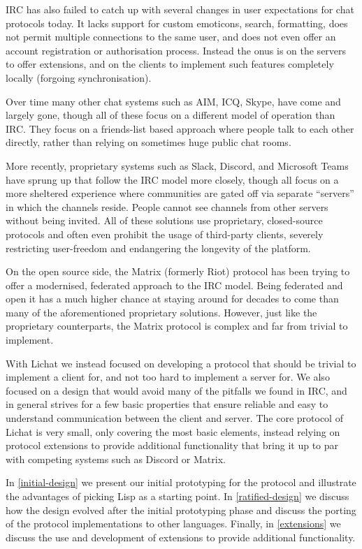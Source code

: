 \documentclass[format=sigconf]{acmart}
\begin{document}
IRC has also failed to catch up with several changes in user expectations for chat protocols today. It lacks support for custom emoticons, search, formatting, does not permit multiple connections to the same user, and does not even offer an account registration or authorisation process. Instead the onus is on the servers to offer extensions, and on the clients to implement such features completely locally (forgoing synchronisation).

Over time many other chat systems such as AIM, ICQ, Skype, have come and largely gone, though all of these focus on a different model of operation than IRC. They focus on a friends-list based approach where people talk to each other directly, rather than relying on sometimes huge public chat rooms.

More recently, proprietary systems such as Slack, Discord, and Microsoft Teams have sprung up that follow the IRC model more closely, though all focus on a more sheltered experience where communities are gated off via separate ``servers'' in which the channels reside. People cannot see channels from other servers without being invited. All of these solutions use proprietary, closed-source protocols and often even prohibit the usage of third-party clients, severely restricting user-freedom and endangering the longevity of the platform.

On the open source side, the Matrix (formerly Riot) protocol has been trying to offer a modernised, federated approach to the IRC model. Being federated and open it has a much higher chance at staying around for decades to come than many of the aforementioned proprietary solutions. However, just like the proprietary counterparts, the Matrix protocol is complex and far from trivial to implement.

With Lichat we instead focused on developing a protocol that should be trivial to implement a client for, and not too hard to implement a server for. We also focused on a design that would avoid many of the pitfalls we found in IRC, and in general strives for a few basic properties that ensure reliable and easy to understand communication between the client and server. The core protocol of Lichat is very small, only covering the most basic elements, instead relying on protocol extensions to provide additional functionality that bring it up to par with competing systems such as Discord or Matrix.

In \autoref{initial-design} we present our initial prototyping for the protocol and illustrate the advantages of picking Lisp as a starting point. In \autoref{ratified-design} we discuss how the design evolved after the initial prototyping phase and discuss the porting of the protocol implementations to other languages. Finally, in \autoref{extensions} we discuss the use and development of extensions to provide additional functionality.
\end{document}
